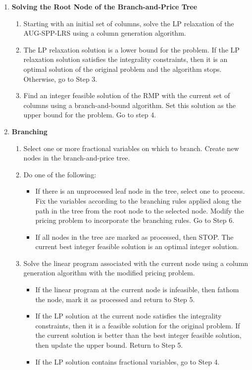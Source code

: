\begin {enumerate}
\item {\bf Solving the Root Node of the Branch-and-Price Tree} 
  \begin {enumerate}
  \item [{\bf Step 1.}] Starting with an initial set of columns, solve the LP relaxation 
    of the AUG-SPP-LRS using a column generation algorithm.
  \item [{\bf Step 2.}] The LP relaxation solution is a lower bound for the problem.  
    If the LP relaxation solution satisfies the integrality constraints, 
    then it is an optimal solution of the original problem and the algorithm stops.  
    Otherwise, go to Step 3. 
  \item [{\bf Step 3.}] Find an integer feasible solution of the RMP with the current set of 
    columns using a branch-and-bound algorithm. Set this solution as the upper bound for the problem. 
    Go to step 4. 
  \end{enumerate}
\item {\bf Branching} 
  \begin{enumerate}
  \item [{\bf Step 4.}] Select one or more fractional variables on which to branch. 
    Create new nodes in the branch-and-price tree. 
  \item [{\bf Step 5.}] Do one of the following: 
    \begin {itemize}
    \item If there is an unprocessed leaf node in the tree, select one to process. Fix the 
      variables  according to the branching 
      rules applied along the path in the tree from the root node to the selected node. Modify the 
      pricing problem to incorporate the branching rules. Go to Step 6.
    \item If all nodes in the tree are marked as processed, then STOP. The current best integer
      feasible solution is an optimal integer solution.
    \end{itemize}
  \item [{\bf Step 6.}] Solve the linear program associated with the current node using 
      a column generation algorithm with the modified pricing problem. 
      \begin {itemize}
      \item If the linear program at the current node is infeasible, then fathom the node,
	mark it as processed and return to Step 5. 
      \item If the LP solution at the current node satisfies the integrality constraints, 
        then it is a feasible solution for the original problem. If the current solution
        is better than the best integer feasible solution, then update the upper bound. 
	Return to Step 5. 
      \item If the LP solution contains fractional variables, go to Step 4. 
    \end{itemize}
  \end {enumerate}
\end{enumerate}

